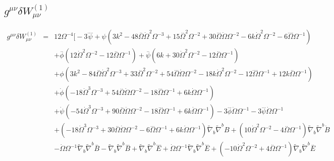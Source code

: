 \documentclass[10pt,letterpaper]{article}
\numberwithin{equation}{section}
\begin{document}
\subsection{$g^{\mu\nu}\delta W_{\mu\nu}^{(1)}$}
\begin{eqnarray}
g^{\mu\nu}\delta W_{\mu\nu}^{(1)}&=&12\Omega^{-4}\Bigg[-3 \overset{....}{\psi} + \psi (3 k^2 - 48 \overset{..}{\Omega} \dot{\Omega}^2 \Omega^{-3} + 15 \overset{..}{\Omega}^2 \Omega^{-2} + 30 \overset{...}{\Omega} \dot{\Omega} \Omega^{-2} - 6 k \dot{\Omega}^2 \Omega^{-2} - 6 \overset{....}{\Omega} \Omega^{-1}) \nonumber \\ 
&& + \overset{..}{\phi} (12 \dot{\Omega}^2 \Omega^{-2} - 12 \overset{..}{\Omega} \Omega^{-1}) + \overset{..}{\psi} (6 k + 30 \dot{\Omega}^2 \Omega^{-2} - 12 \overset{..}{\Omega} \Omega^{-1}) \nonumber \\ 
&& + \phi (3 k^2 - 84 \overset{..}{\Omega} \dot{\Omega}^2 \Omega^{-3} + 33 \overset{..}{\Omega}^2 \Omega^{-2} + 54 \overset{...}{\Omega} \dot{\Omega} \Omega^{-2} - 18 k \dot{\Omega}^2 \Omega^{-2} - 12 \overset{....}{\Omega} \Omega^{-1} + 12 k \overset{..}{\Omega} \Omega^{-1}) \nonumber \\ 
&& + \dot{\phi} (-18 \dot{\Omega}^3 \Omega^{-3} + 54 \overset{..}{\Omega} \dot{\Omega} \Omega^{-2} - 18 \overset{...}{\Omega} \Omega^{-1} + 6 k \dot{\Omega} \Omega^{-1}) \nonumber \\ 
&& + \dot{\psi} (-54 \dot{\Omega}^3 \Omega^{-3} + 90 \overset{..}{\Omega} \dot{\Omega} \Omega^{-2} - 18 \overset{...}{\Omega} \Omega^{-1} + 6 k \dot{\Omega} \Omega^{-1}) - 3 \overset{...}{\phi} \dot{\Omega} \Omega^{-1} - 3 \overset{...}{\psi} \dot{\Omega} \Omega^{-1} \nonumber \\ 
&& + (-18 \dot{\Omega}^3 \Omega^{-3} + 30 \overset{..}{\Omega} \dot{\Omega} \Omega^{-2} - 6 \overset{...}{\Omega} \Omega^{-1} + 6 k \dot{\Omega} \Omega^{-1}) \tilde{\nabla}_{b}\tilde{\nabla}^{b}B + (10 \dot{\Omega}^2 \Omega^{-2} - 4 \overset{..}{\Omega} \Omega^{-1}) \tilde{\nabla}_{b}\tilde{\nabla}^{b}\dot{B} \nonumber \\ 
&& -  \dot{\Omega} \Omega^{-1} \tilde{\nabla}_{b}\tilde{\nabla}^{b}\overset{..}{B} -  \tilde{\nabla}_{b}\tilde{\nabla}^{b}\overset{...}{B} + \tilde{\nabla}_{b}\tilde{\nabla}^{b}\overset{....}{E} + \dot{\Omega} \Omega^{-1} \tilde{\nabla}_{b}\tilde{\nabla}^{b}\overset{...}{E} + (-10 \dot{\Omega}^2 \Omega^{-2} + 4 \overset{..}{\Omega} \Omega^{-1}) \tilde{\nabla}_{b}\tilde{\nabla}^{b}\overset{..}{E} \nonumber \\ 

\end{eqnarray}
\end{document}

